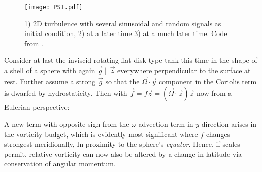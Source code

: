 \begin{figure}
\texttt{[image: PSI.pdf]}
\caption{1) 2D turbulence with several sinusoidal and random signals as initial condition, 2) at a later time 3) at a much later time. Code from
\cite{Seibold2008a}.}
\end{figure}

\begin{turbu}\label{turb:beta}
Consider at last the inviscid rotating flat-disk-type tank this time in the shape of a shell of a sphere with again $\vec{g} \parallel \vec{z}$ everywhere
perpendicular to the surface at rest. Further assume a strong $\vec{g}$ so that the $\vec{\Omega} \cdot \vec{y}$ component in the Coriolis term is dwarfed by
hydrostaticity. Then with $\vec{f}=f \vec{z} = \left( \vec{\Omega} \cdot \vec{z} \right)\vec{z}$ now from a Eulerian perspective:

A new term with opposite sign from the $\omega$-advection-term in $y$-direction arises in the vorticity budget, which is evidently most significant where $f$
changes strongest meridionally, \ie In proximity to the sphere's \textit{equator}. Hence, if scales permit, relative vorticity can now also be altered by a
change in latitude via conservation of angular momentum.
\end{turbu}
